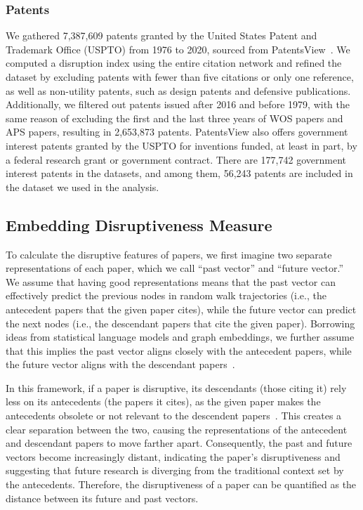 \documentclass[12pt]{article}
\begin{document}
\begin{refsection}
\subsubsection{Patents}

We gathered 7,387,609 patents granted by the United States Patent and Trademark Office (USPTO) from 1976 to 2020, sourced from PatentsView~\cite{uspto_patentsview}. We computed a disruption index using the entire citation network and refined the dataset by excluding patents with fewer than five citations or only one reference, as well as non-utility patents, such as design patents and defensive publications. Additionally, we filtered out patents issued after 2016 and before 1979, with the same reason of excluding the first and the last three years of WOS papers and APS papers, resulting in 2,653,873 patents. PatentsView also offers government interest patents granted by the USPTO for inventions funded, at least in part, by a federal research grant or government contract. There are 177,742 government interest patents in the datasets, and among them, 56,243 patents are included in the dataset we used in the analysis.




\subsection{Embedding Disruptiveness Measure}
\label{sec:method_edm}



To calculate the disruptive features of papers, we first imagine two separate representations of each paper, which we call ``past vector'' and ``future vector.'' We assume that having good representations means that the past vector can effectively predict the previous nodes in random walk trajectories (i.e., the antecedent papers that the given paper cites), while the future vector can predict the next nodes (i.e., the descendant papers that cite the given paper). Borrowing ideas from statistical language models and graph embeddings, we further assume that this implies the past vector aligns closely with the antecedent papers, while the future vector aligns with the descendant papers~\cite{grover2016node2vec,mikolov2013distributed, perozzi2014deepwalk, tang2015line,}.


In this framework, if a paper is disruptive, its descendants (those citing it) rely less on its antecedents (the papers it cites), as the given paper makes the antecedents obsolete or not relevant to the descendent papers~\cite{funk2017dynamic}. This creates a clear separation between the two, causing the representations of the antecedent and descendant papers to move farther apart. Consequently, the past and future vectors become increasingly distant, indicating the paper’s disruptiveness and suggesting that future research is diverging from the traditional context set by the antecedents. Therefore, the disruptiveness of a paper can be quantified as the distance between its future and past vectors.



\end{refsection}
\end{document}
